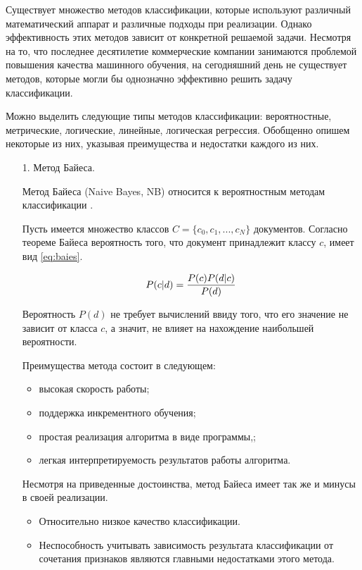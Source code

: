 Существует множество методов классификации, которые используют различный математический аппарат и различные подходы при реализации. Однако эффективность этих методов зависит от конкретной решаемой задачи. Несмотря на то, что последнее десятилетие коммерческие компании занимаются проблемой повышения качества машинного обучения, на сегодняшний день не существует методов, которые могли бы однозначно эффективно решить задачу классификации. 

Можно выделить следующие типы методов классификации: вероятностные, метрические, логические, линейные, логическая регрессия. Обобщенно опишем некоторые из них, указывая преимущества и недостатки каждого из них. 

\begin{enumerate}
\item[1.] Метод Байеса.

Метод Байеса (Naive Bayes, NB) относится к вероятностным методам классификации \cite{baes}. 

Пусть имеется множество классов $C = \{c_0, c_1, ..., c_N\}$ документов. Согласно теореме Байеса вероятность того, что документ принадлежит классу $c$, имеет вид \ref{eq:baies}.

\begin{equation}
	\centering
	P(c|d)=\frac{P(c)P(d|c)}{P(d)}
	\label{eq:baies}
\end{equation}

Вероятность $P(d)$ не требует вычислений ввиду того, что его значение не зависит от класса $c$, а значит, не влияет на нахождение наибольшей вероятности. 

Преимущества метода состоит в следующем: 
\begin{itemize}
\item высокая скорость работы;
\item поддержка инкрементного обучения;
\item простая реализация алгоритма в виде программы,;
\item легкая интерпретируемость результатов работы алгоритма. 
\end{itemize}

Несмотря на приведенные достоинства, метод Байеса имеет так же и минусы в своей реализации. 
\begin{itemize}
\item Относительно низкое качество классификации. 
\item Неспособность учитывать зависимость результата классификации от сочетания признаков являются главными недостатками этого метода.
\end{itemize}


\end{enumerate}
